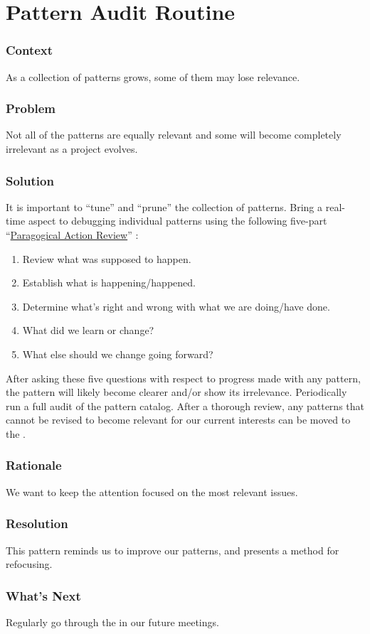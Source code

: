 \section{Pattern Audit Routine}\label{sec:Pattern_Audit_Routine}

\subsubsection*{Context} As a collection of patterns grows, some of them may lose relevance.

\subsubsection*{Problem} Not all of the patterns are equally relevant and some will become completely irrelevant as a project evolves.

\subsubsection*{Solution} It is important to ``tune'' and ``prune'' the collection of patterns.  Bring a real-time aspect to debugging individual patterns using the following five-part ``\href{http://metameso.org/~joe/docs/The-Paragogical-Action-Review.pdf}{Paragogical Action Review}'' \cite[Chapter 28]{peeragogy-handbook}:

\begin{enumerate}
\item Review what was supposed to happen.
\item Establish what is happening/happened.
\item Determine what’s right and wrong with what we are doing/have done.
\item What did we learn or change?
\item What else should we change going forward?
\end{enumerate}

After asking these five questions with respect to progress made with any pattern, the pattern will likely become clearer and/or show its irrelevance.  Periodically run a full audit of the pattern catalog.   After a thorough review, any patterns that cannot be revised to become relevant for our current interests can be moved to the .

\subsubsection*{Rationale} We want to keep the attention focused on the most relevant issues.

\subsubsection*{Resolution} This pattern reminds us to improve our patterns, and presents a method for refocusing.

\subsubsection*{What's Next} Regularly go through the  in our future meetings.
